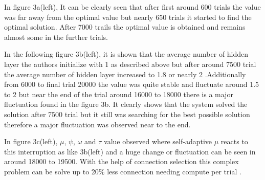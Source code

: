 \documentclass[12pt]{article}
\begin{document}
In figure 3a(left), It can be clearly seen that after first around 600 trials the value was far away from the optimal value but nearly 650 trials it started to find the optimal solution. After 7000 trails the optimal value is obtained and remains almost some in the further trials.

In the following figure 3b(left),  it is shown that  the average number of hidden layer the authors initialize with 1 as described above but after around 7500 trial the average number of hidden layer increased to 1.8 or nearly 2 .Additionally from 6000 to final trial 20000 the value was quite stable and fluctuate around 1.5 to 2 but near the end of the trial around 16000 to 18000 there is a major fluctuation found in the  figure 3b. It clearly shows that the system solved the solution after 7500 trial but it still was searching for the best possible solution therefore a major fluctuation was observed near to the end.

In figure 3c(left), $\mu$, $\psi$, $\omega$ and $\tau$ value observed where self-adaptive $\mu$ reacts to this interruption as like 3b(left) and a huge change or fluctuation can be seen in around 18000 to 19500. With the help of connection selection this complex problem can be solve up to 20\% less connection needing compute per trial \cite{10.1145/1068009.1068210}. 
\end{document}
